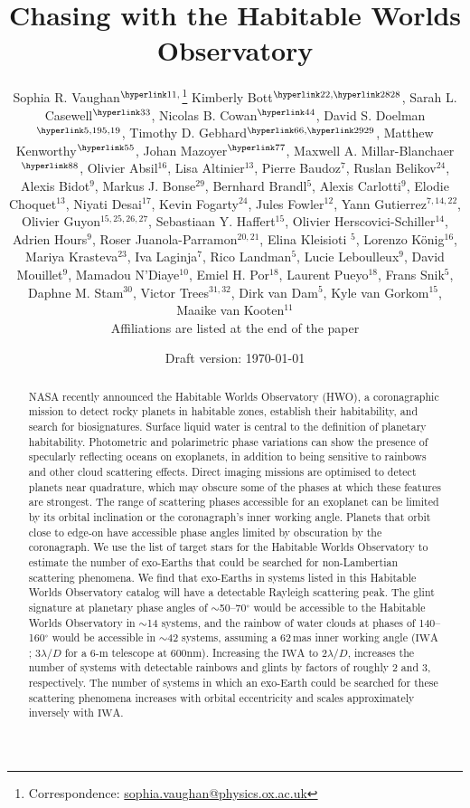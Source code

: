 \documentclass[
    usenatbib,
]{mnras}
\title{Chasing \rainbows{} with the Habitable Worlds Observatory}
\author[Sophia R. Vaughan et al.]{%
    Sophia R. Vaughan$^{\affiliationlink{1},}$\thanks{Correspondence:  \url{sophia.vaughan@physics.ox.ac.uk}}
    Kimberly Bott$^{\affiliationlink{2},\affiliationlink{28}}$,
    Sarah L. Casewell$^{\affiliationlink{3}}$,
    Nicolas B. Cowan$^{\affiliationlink{4}}$,
    David S. Doelman$^{\affiliationlink{5,19}}$,
    \newauthor 
    Timothy D. Gebhard$^{\affiliationlink{6},\affiliationlink{29}}$,
    Matthew Kenworthy$^{\affiliationlink{5}}$,
    Johan Mazoyer$^{\affiliationlink{7}}$,
    Maxwell A. Millar-Blanchaer$^{\affiliationlink{8}}$,
    \newauthor 
    Olivier Absil$^{16}$,
    Lisa Altinier$^{13}$,
    Pierre Baudoz$^{7}$,
    Ruslan Belikov$^{24}$,
    Alexis Bidot$^{9}$,
    Markus J. Bonse$^{29}$,
    \newauthor 
    Bernhard Brandl$^{5}$,
    Alexis Carlotti$^{9}$,
    Elodie Choquet$^{13}$,
    Niyati Desai$^{17}$,
    Kevin Fogarty$^{24}$,
    Jules Fowler$^{12}$,
    \newauthor
    Yann Gutierrez$^{7,14,22}$,
    Olivier Guyon$^{15,25,26,27}$,
    Sebastiaan Y. Haffert$^{15}$,
    Olivier Herscovici-Schiller$^{14}$, 
    \newauthor
    Adrien Hours$^{9}$,
    Roser Juanola-Parramon$^{20,21}$,
    Elina Kleisioti $^{5}$,
    Lorenzo König$^{16}$,
    Mariya Krasteva$^{23}$, 
    \newauthor
    Iva Laginja$^{7}$,
    Rico Landman$^{5}$,
    Lucie Leboulleux$^{9}$,
    David Mouillet$^{9}$,
    Mamadou N’Diaye$^{10}$,
    Emiel H. Por$^{18}$,
    \newauthor
    Laurent Pueyo$^{18}$,
    Frans Snik$^{5}$,
    Daphne M. Stam$^{30}$,
    Victor Trees$^{31,32}$,
    Dirk van Dam$^{5}$,
    Kyle van Gorkom$^{15}$,
    \newauthor
    Maaike van Kooten$^{11}$ 
    \newauthor \\%
    Affiliations are listed at the end of the paper
}
\date{Draft version: \today}
\newcommand{\IWA}{\ensuremath{\mathrm{IWA}}}
\begin{document}
 

\maketitle

\begin{abstract}
NASA recently announced the Habitable Worlds Observatory (HWO), a coronagraphic mission to detect rocky planets in habitable zones, establish their habitability, and search for biosignatures. 
Surface liquid water is central to the definition of planetary habitability.
%
Photometric and polarimetric phase variations can show the presence of specularly reflecting oceans on exoplanets, in addition to being sensitive to rainbows and other cloud scattering effects. 
%
Direct imaging missions are optimised to detect planets near quadrature, which may obscure some of the phases at which these features are strongest. 
%
The range of scattering phases accessible for an exoplanet can be limited by its orbital inclination or the coronagraph's inner working angle. 
%
Planets that orbit close to edge-on have accessible phase angles limited by obscuration by the coronagraph. 
%
We use the list of target stars for the Habitable Worlds Observatory to estimate the number of exo-Earths that could be searched for non-Lambertian scattering phenomena. 
%
We find that exo-Earths in systems listed in this Habitable Worlds Observatory catalog will have a detectable Rayleigh scattering peak. 
%
The glint signature at planetary phase angles of $\sim$50--70$^\circ$ 
would be accessible to the Habitable Worlds Observatory in $\sim$14 systems, and the rainbow of water clouds at phases of 140--160$^\circ$ would be accessible in $\sim$42 systems, assuming a 62\,mas inner working angle (\IWA{}; 3$\lambda/D$ for a 6-m telescope at 600nm).
%
Increasing the \IWA{} to 2$\lambda/D$, increases the number of systems with detectable rainbows and glints by factors of roughly 2 and 3, respectively.
%
The number of systems in which an exo-Earth could be searched for these scattering phenomena increases with orbital eccentricity and scales approximately inversely with \IWA{}.    \end{abstract}
\end{document}
